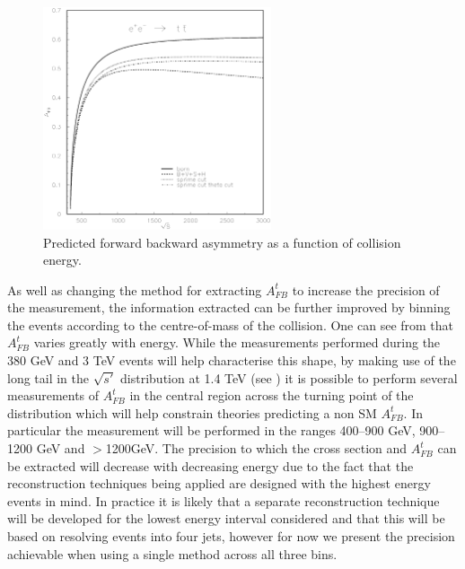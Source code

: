 \begin{figure}
  \centering
  \includegraphics[width=0.6\textwidth]{TopAnalysis/figures/asym-top.eps}
  \caption[Predicted forward backward asymmetry as a function of collision energy]{Predicted forward backward asymmetry as a function of collision energy\cite{Fleischer:2003kk}.}
  \label{fig:afbVEtheory}
\end{figure}

As well as changing the method for extracting $A_{FB}^t$ to increase the precision of the measurement, the information extracted can be further improved by binning the events according to the centre-of-mass of the collision. One can see from  that $A_{FB}^t$ varies greatly with energy. While the measurements performed during the 380 GeV and 3 TeV events will help characterise this shape, by making use of the long tail in the $\sqrt{s'}$ distribution at 1.4 TeV (see ) it is possible to perform several measurements of $A_{FB}^t$ in the central region across the turning point of the distribution which will help constrain theories predicting a non \ac{SM} $A_{FB}^t$. In particular the measurement will be performed in the ranges 400--900 GeV, 900--1200 GeV and $>$1200GeV. The precision to which the cross section  and $A_{FB}^t$ can be extracted will decrease with decreasing energy due to the fact that the reconstruction techniques being applied are designed with the highest energy events in mind. In practice it is likely that a separate reconstruction technique will be developed for the lowest energy interval considered and that this will be based on resolving events into four jets, however for now we present the precision achievable when using a single method across all three bins. 

